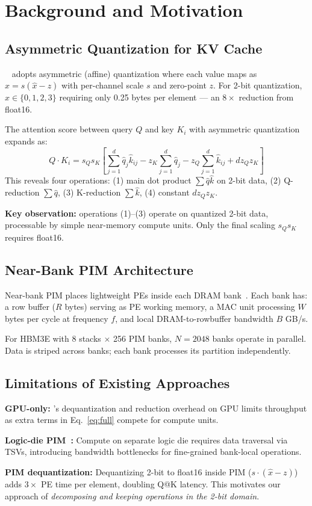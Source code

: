 \section{Background and Motivation}

\subsection{Asymmetric Quantization for KV Cache}

\kivi{}~\cite{kivi} adopts asymmetric (affine) quantization where each value maps as $x = s(\hat{x} - z)$ with per-channel scale $s$ and zero-point $z$.
For 2-bit quantization, $\hat{x} \in \{0,1,2,3\}$ requiring only 0.25 bytes per element --- an $8\times$ reduction from float16.

The attention score between query $Q$ and key $K_i$ with asymmetric quantization expands as:
\begin{equation}
Q \cdot K_i = s_Q s_K \!\left[\sum_{j=1}^{d} \hat{q}_j \hat{k}_{ij} - z_K\!\sum_{j=1}^{d} \hat{q}_j - z_Q\!\sum_{j=1}^{d} \hat{k}_{ij} + d z_Q z_K\right]
\label{eq:full}
\end{equation}
This reveals four operations: (1) main dot product $\sum \hat{q}\hat{k}$ on 2-bit data, (2) Q-reduction $\sum\hat{q}$, (3) K-reduction $\sum\hat{k}$, (4) constant $d z_Q z_K$.

\textbf{Key observation:} operations (1)--(3) operate on quantized 2-bit data, processable by simple near-memory compute units. Only the final scaling $s_Q s_K$ requires float16.

\subsection{Near-Bank PIM Architecture}

Near-bank PIM places lightweight PEs inside each DRAM bank~\cite{seshadri2017ambit}.
Each bank has: a row buffer ($R$ bytes) serving as PE working memory, a MAC unit processing $W$ bytes per cycle at frequency $f$, and local DRAM-to-rowbuffer bandwidth $B$ GB/s.

For HBM3E with 8 stacks $\times$ 256 PIM banks, $N=2048$ banks operate in parallel.
Data is striped across banks; each bank processes its partition independently.

\subsection{Limitations of Existing Approaches}

\textbf{GPU-only:} \kivi{}'s dequantization and reduction overhead on GPU limits throughput as extra terms in Eq.~\ref{eq:full} compete for compute units.

\textbf{Logic-die PIM~\cite{duplex}:} Compute on separate logic die requires data traversal via TSVs, introducing bandwidth bottlenecks for fine-grained bank-local operations.

\textbf{PIM dequantization:} Dequantizing 2-bit to float16 inside PIM ($s \cdot (\hat{x} - z)$) adds $3\times$ PE time per element, doubling Q@K latency. This motivates our approach of \emph{decomposing and keeping operations in the 2-bit domain}.
